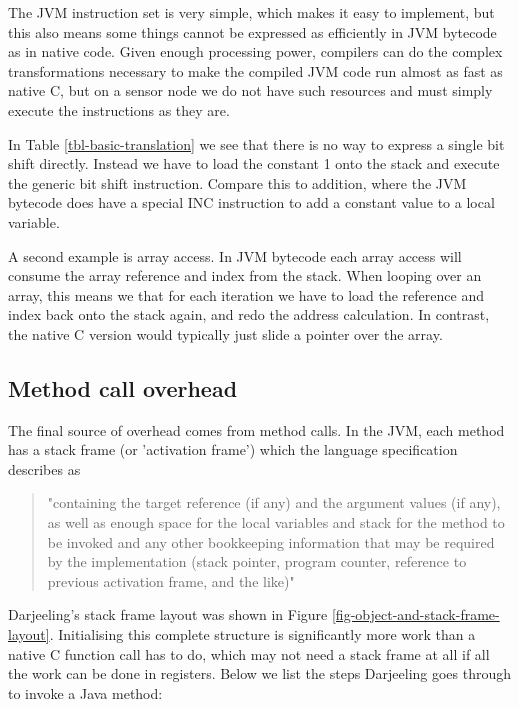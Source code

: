 The JVM instruction set is very simple, which makes it easy to implement, but this also means some things cannot be expressed as efficiently in JVM bytecode as in native code. Given enough processing power, compilers can do the complex transformations necessary to make the compiled JVM code run almost as fast as native C, but on a sensor node we do not have such resources and must simply execute the instructions as they are.

In Table \ref{tbl-basic-translation} we see that there is no way to express a single bit shift directly. Instead we have to load the constant 1 onto the stack and execute the generic bit shift instruction. Compare this to addition, where the JVM bytecode does have a special INC instruction to add a constant value to a local variable.

A second example is array access. In JVM bytecode each array access will consume the array reference and index from the stack. When looping over an array, this means we that for each iteration we have to load the reference and index back onto the stack again, and redo the address calculation. In contrast, the native C version would typically just slide a pointer over the array.

\subsection{Method call overhead}
\label{sec-overhead-method-call}
The final source of overhead comes from method calls. In the JVM, each method has a stack frame (or 'activation frame') which the language specification describes as
\begin{quotation}
"containing the target reference (if any) and the argument values (if any), as well as enough space for the local variables and stack for the method to be invoked and any other bookkeeping information that may be required by the implementation (stack pointer, program counter, reference to previous activation frame, and the like)" \cite{Gosling:2014}
\end{quotation}

Darjeeling's stack frame layout was shown in Figure \ref{fig-object-and-stack-frame-layout}. Initialising this complete structure is significantly more work than a native C function call has to do, which may not need a stack frame at all if all the work can be done in registers. Below we list the steps Darjeeling goes through to invoke a Java method:

